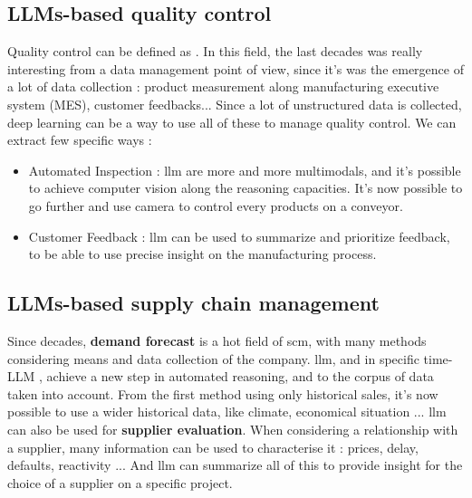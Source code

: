 \subsection{LLMs-based quality control}
\label{sec:llm_quality}
Quality control can be defined as  \cite{noauthor_what_nodate}. In this field, the last decades was really interesting from a data management point of view, since it's was the emergence of a lot of data collection : product measurement along manufacturing executive system (MES), customer feedbacks... Since a lot of unstructured data is collected, deep learning can be a way to use all of these to manage quality control. We can extract few specific ways : 

\begin{itemize}
    \item Automated Inspection : \acrshort{llm} are more and more multimodals, and it's possible to achieve computer vision along the reasoning capacities. It's now possible to go further and use camera to control every products on a conveyor. 
    \item Customer Feedback : \acrshort{llm} can be used to summarize and prioritize feedback, to be able to use precise insight on the manufacturing process.
\end{itemize}

\subsection{LLMs-based supply chain management}
\label{sec:llm_scm}
Since decades, \textbf{demand forecast} is a hot field of \acrfull{scm}, with many methods considering means and data collection of the company. \acrshort{llm}, and in specific time-LLM \cite{jin_time-llm_2024}, achieve a new step in automated reasoning, and to the corpus of data taken into account. From the first method using only historical sales, it's now possible to use a wider historical data, like climate, economical situation ... \acrshort{llm} can also be used for \textbf{supplier evaluation}. When considering a relationship with a supplier, many information can be used to characterise it : prices, delay, defaults, reactivity ... And \acrshort{llm} can summarize all of this to provide insight for the choice of a supplier on a specific project.   


